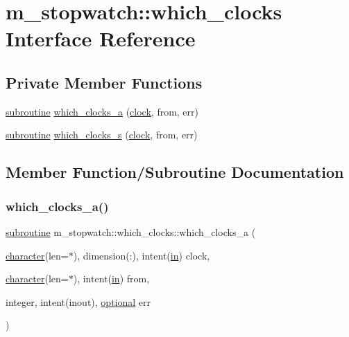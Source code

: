 \hypertarget{interfacem__stopwatch_1_1which__clocks}{}\section{m\+\_\+stopwatch\+:\+:which\+\_\+clocks Interface Reference}
\label{interfacem__stopwatch_1_1which__clocks}
\subsection*{Private Member Functions}
\begin{DoxyCompactItemize}
\item 
\hyperlink{M__stopwatch_83_8txt_acfbcff50169d691ff02d4a123ed70482}{subroutine} \hyperlink{interfacem__stopwatch_1_1which__clocks_a91d1498a33c2ba3ab76c4ae438accb70}{which\+\_\+clocks\+\_\+a} (\hyperlink{stop__watch_83_8txt_a148c035b430d6edf5413dbd2704facfb}{clock}, from, err)
\item 
\hyperlink{M__stopwatch_83_8txt_acfbcff50169d691ff02d4a123ed70482}{subroutine} \hyperlink{interfacem__stopwatch_1_1which__clocks_a2192ebab810d02eb9fdafb5aaa027b9f}{which\+\_\+clocks\+\_\+s} (\hyperlink{stop__watch_83_8txt_a148c035b430d6edf5413dbd2704facfb}{clock}, from, err)
\end{DoxyCompactItemize}


\subsection{Member Function/\+Subroutine Documentation}
\mbox{\label{interfacem__stopwatch_1_1which__clocks_a91d1498a33c2ba3ab76c4ae438accb70}} 
\subsubsection{\texorpdfstring{which\+\_\+clocks\+\_\+a()}{which\_clocks\_a()}}
{\footnotesize\ttfamily \hyperlink{M__stopwatch_83_8txt_acfbcff50169d691ff02d4a123ed70482}{subroutine} m\+\_\+stopwatch\+::which\+\_\+clocks\+::which\+\_\+clocks\+\_\+a (\begin{DoxyParamCaption}\item[{\hyperlink{option__stopwatch_83_8txt_abd4b21fbbd175834027b5224bfe97e66}{character}(len=$\ast$), dimension(\+:), intent(\hyperlink{M__journal_83_8txt_afce72651d1eed785a2132bee863b2f38}{in})}]{clock,  }\item[{\hyperlink{option__stopwatch_83_8txt_abd4b21fbbd175834027b5224bfe97e66}{character}(len=$\ast$), intent(\hyperlink{M__journal_83_8txt_afce72651d1eed785a2132bee863b2f38}{in})}]{from,  }\item[{integer, intent(inout), \hyperlink{option__stopwatch_83_8txt_aa4ece75e7acf58a4843f70fe18c3ade5}{optional}}]{err }\end{DoxyParamCaption})\hspace{0.3cm}{\ttfamily [private]}}

